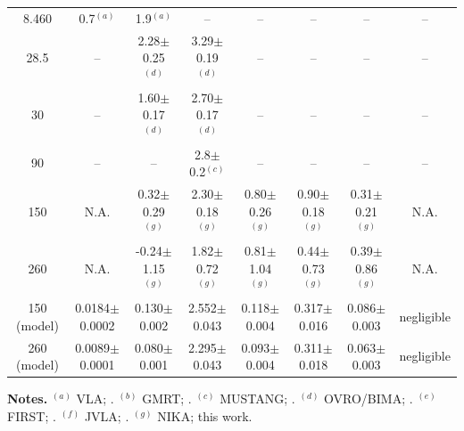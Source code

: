 \documentclass[twocolumn,traditabstract]{aa}
\begin{document}
\begin{table}[h]
\begin{center}
\begin{tabular}{c|ccccccc}
8.460 & 0.7$^{(a)}$ & 1.9$^{(a)}$ &  --  &  --  &  --  &  --  &  --  \\
28.5 &  --  & 2.28$\pm$0.25$^{(d)}$ & 3.29$\pm$0.19$^{(d)}$ &  --  &  --  &  --  &  --  \\
30 &  --  & 1.60$\pm$0.17$^{(d)}$ & 2.70$\pm$0.17$^{(d)}$ &  --  &  --  &  --  &  --  \\
90 &  --  &  --  & 2.8$\pm$0.2$^{(c)}$ &  --  &  --  &  --  &  --  \\
150 &    N.A. &     0.32$\pm$    0.29$^{(g)}$ &     2.30$\pm$    0.18$^{(g)}$ &     0.80$\pm$    0.26$^{(g)}$ &     0.90$\pm$    0.18$^{(g)}$ &     0.31$\pm$    0.21$^{(g)}$ &  N.A. \\
260 &    N.A. &    -0.24$\pm$    1.15$^{(g)}$ &     1.82$\pm$    0.72$^{(g)}$ &     0.81$\pm$    1.04$^{(g)}$ &     0.44$\pm$    0.73$^{(g)}$ &     0.39$\pm$    0.86$^{(g)}$ &  N.A. \\
\hline
150 (model) &   0.0184$\pm$  0.0002 &   0.130$\pm$  0.002 &   2.552$\pm$  0.043 &   0.118$\pm$  0.004 &   0.317$\pm$  0.016 &   0.086$\pm$  0.003 &   negligible \\
260 (model) &   0.0089$\pm$  0.0001 &   0.080$\pm$  0.001 &   2.295$\pm$  0.043 &   0.093$\pm$  0.004 &   0.311$\pm$  0.018 &   0.063$\pm$  0.003 &   negligible \\
\hline
\end{tabular}
\end{center}
{\small {\bf Notes.} $^{(a)}$ VLA; \cite{Bonafede2009}. $^{(b)}$ GMRT; \cite{PandeyPommier2013}. $^{(c)}$ MUSTANG; \cite{Mroczkowski2012}. $^{(d)}$ OVRO/BIMA; \cite{LaRoque2003,Coble2007}. $^{(e)}$ FIRST; \cite{Condon1998}. $^{(f)}$ JVLA; \cite{vanWeeren2016}. $^{(g)}$ NIKA; this work.}
\label{tab:radio_sources}
\end{table}

\end{document}
